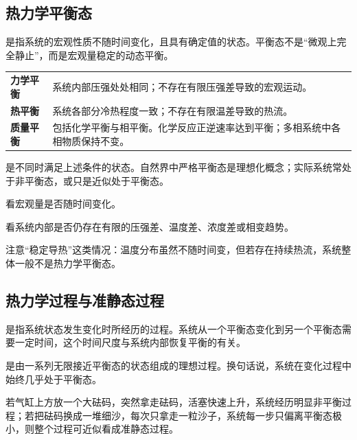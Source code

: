 \subsection{热力学平衡态}

是指系统的宏观性质不随时间变化，且具有确定值的状态。平衡态不是“微观上完全静止”，而是宏观量稳定的动态平衡。

\begin{FormulaBox}[平衡态的必要条件]
\begin{tabularx}{\textwidth}{@{}>{\bfseries}lX@{}}
力学平衡 & 系统内部压强处处相同；不存在有限压强差导致的宏观运动。\\
热平衡 & 系统各部分冷热程度一致；不存在有限温差导致的热流。\\
质量平衡 & 包括化学平衡与相平衡。化学反应正逆速率达到平衡；多相系统中各相物质保持不变。\\
\end{tabularx}
\end{FormulaBox}

是不同时满足上述条件的状态。自然界中严格平衡态是理想化概念；实际系统常处于非平衡态，或只是近似处于平衡态。

\begin{MethodBox}[判断平衡态的思路]
\begin{ReviewList}
  \item 看宏观量是否随时间变化。
  \item 看系统内部是否仍存在有限的压强差、温度差、浓度差或相变趋势。
  \item 注意“稳定导热”这类情况：温度分布虽然不随时间变，但若存在持续热流，系统整体一般不是热力学平衡态。
\end{ReviewList}
\end{MethodBox}

\subsection{热力学过程与准静态过程}

是指系统状态发生变化时所经历的过程。系统从一个平衡态变化到另一个平衡态需要一定时间，这个时间尺度与系统内部恢复平衡的有关。

是由一系列无限接近平衡态的状态组成的理想过程。换句话说，系统在变化过程中始终几乎处于平衡态。

\begin{KeyBox}[准静态过程的物理图像]
若气缸上方放一个大砝码，突然拿走砝码，活塞快速上升，系统经历明显非平衡过程；若把砝码换成一堆细沙，每次只拿走一粒沙子，系统每一步只偏离平衡态极小，则整个过程可近似看成准静态过程。
\end{KeyBox}

